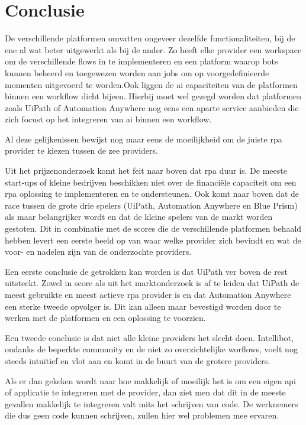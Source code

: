 \chapter{Conclusie}
\label{ch:conclusie}
De verschillende platformen omvatten ongeveer dezelfde functionaliteiten, bij de ene al wat beter uitgewerkt als bij de ander. Zo heeft elke provider een workspace om de verschillende flows in te implementeren en een platform waarop bots kunnen beheerd en toegewezen worden aan jobs om op voorgedefinieerde momenten uitgevoerd te worden.Ook liggen de \acrshort{ai} capaciteiten van de platformen binnen een workflow dicht bijeen. Hierbij moet wel gezegd worden dat platformen zoals UiPath of Automation Anywhere nog eens een aparte service aanbieden die zich focust op het integreren van \acrshort{ai} binnen een workflow.

Al deze gelijkenissen bewijst nog maar eens de moeilijkheid om de juiste \acrshort{rpa} provider te kiezen tussen de zee providers.

Uit het prijzenonderzoek komt het feit naar boven dat \acrshort{rpa} duur is. De meeste start-ups of kleine bedrijven beschikken niet over de financiële capaciteit om een \acrshort{rpa} oplossing te implementeren en te ondersteunen. Ook komt naar boven dat de race tussen de grote drie spelers (UiPath, Automation Anywhere en Blue Prism) als maar belangrijker wordt en dat de kleine spelers van de markt worden gestoten. Dit in combinatie met de scores die de verschillende platformen behaald hebben levert een eerste beeld op van waar welke provider zich bevindt en wat de voor- en nadelen zijn van de onderzochte providers.

Een eerste conclusie de getrokken kan worden is dat UiPath ver boven de rest uitsteekt. Zowel in score als uit het marktonderzoek is af te leiden dat UiPath de meest gebruikte en meest actieve \acrshort{rpa} provider is en dat Automation Anywhere een sterke tweede opvolger is. Dit kan alleen maar bevestigd worden door te werken met de platformen en een oplossing te voorzien.

Een tweede conclusie is dat niet alle kleine providers het slecht doen. Intellibot, ondanks de beperkte community en de niet zo overzichtelijke worflows, voelt nog steeds intuïtief en vlot aan en komt in de buurt van de grotere providers.

Als er dan gekeken wordt naar hoe makkelijk of moeilijk het is om een eigen \acrshort{api} of applicatie te integreren met de provider, dan ziet men dat dit in de meeste gevallen makkelijk te integreren valt mits het schrijven van code. De werknemers die dus geen code kunnen schrijven, zullen hier wel problemen mee ervaren.


